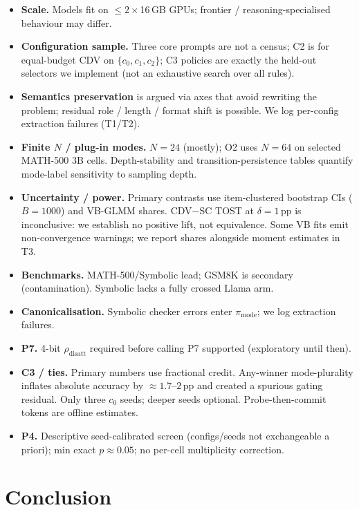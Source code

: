 \documentclass{article}
\newcommand{\pmode}{\pi_{\mathrm{mode}}}
\newcommand{\rdis}{\rho_{\mathrm{disatt}}}
\theoremstyle{plain}
\theoremstyle{definition}
\theoremstyle{remark}
\begin{document}
\begin{itemize}\itemsep1pt
  \item \textbf{Scale.} Models fit on $\le 2\times$16\,GB GPUs; frontier /
    reasoning-specialised behaviour may differ.
  \item \textbf{Configuration sample.} Three core prompts are not a census;
    C2 is for equal-budget CDV on $\{c_0,c_1,c_2\}$; C3 policies are exactly the
    held-out selectors we implement (not an exhaustive search over all rules).
  \item \textbf{Semantics preservation} is argued via axes that avoid rewriting
    the problem; residual role / length / format shift is possible. We log
    per-config extraction failures (T1/T2).
  \item \textbf{Finite $N$ / plug-in modes.} $N{=}24$ (mostly); O2 uses $N{=}64$
    on selected MATH-500 3B cells. Depth-stability and transition-persistence
    tables quantify mode-label sensitivity to sampling depth.
  \item \textbf{Uncertainty / power.} Primary contrasts use item-clustered
    bootstrap CIs ($B{=}1000$) and VB-GLMM shares. CDV$-$SC TOST at
    $\delta{=}1$\,pp is inconclusive: we establish no positive lift, not
    equivalence. Some VB fits emit non-convergence warnings; we report shares
    alongside moment estimates in T3.
  \item \textbf{Benchmarks.} MATH-500/Symbolic lead; GSM8K is secondary
    (contamination). Symbolic lacks a fully crossed Llama arm.
  \item \textbf{Canonicalisation.} Symbolic checker errors enter $\pmode$; we
    log extraction failures.
  \item \textbf{P7.} 4-bit $\rdis$ required before calling P7 supported
    (exploratory until then).
  \item \textbf{C3 / ties.} Primary numbers use fractional credit. Any-winner
    mode-plurality inflates absolute accuracy by ${\approx}1.7$--$2$\,pp and
    created a spurious gating residual. Only three $c_0$ seeds; deeper seeds
    optional. Probe-then-commit tokens are offline estimates.
  \item \textbf{P4.} Descriptive seed-calibrated screen (configs/seeds not
    exchangeable a priori); min exact $p{\approx}0.05$; no per-cell multiplicity
    correction.
\end{itemize}

\section{Conclusion}
\label{sec:conclusion}
\end{document}
